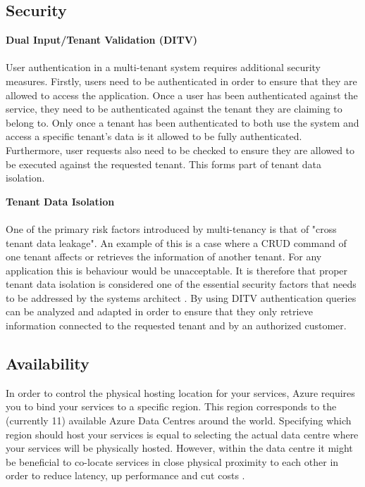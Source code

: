 \subsection{Security}
\label{sec:security} 

\textbf{Dual Input/Tenant Validation (DITV)}
\\
\\
\label{sec:ditv}
User authentication in a multi-tenant system requires additional security measures. Firstly, users need to be authenticated in order to ensure that they are allowed to access the application. Once a user has been authenticated against the service, they need to be authenticated against the tenant they are claiming to belong to. Only once a tenant has been authenticated to both use the system and access a specific tenant's data is it allowed to be fully authenticated. Furthermore, user requests also need to be checked to ensure they are allowed to be executed against the requested tenant. This forms part of tenant data isolation.


\textbf{Tenant Data Isolation}
\\
\\
One of the primary risk factors introduced by multi-tenancy is that of "cross tenant data leakage". An example of this is a case where a CRUD command of one tenant affects or retrieves the information of another tenant. For any application this is behaviour would be unacceptable. It is therefore that proper tenant data isolation is considered one of the essential security factors that needs to be addressed by the systems architect \cite{Wilder2012-so}. By using DITV authentication queries can be analyzed and adapted in order to ensure that they only retrieve information connected to the requested tenant and by an authorized customer.


\subsection{Availability}
\label{sec:availability}
In order to control the physical hosting location for your services, Azure requires you to bind your services to a specific region. This region corresponds to the (currently 11) available Azure Data Centres around the world\cite{Microsoft_Corporation2014-bf}. Specifying which region should host your services is equal to selecting the actual data centre where your services will be physically hosted. However, within the data centre it might be beneficial to co-locate services in close physical proximity to each other in order to reduce latency, up performance and cut costs \cite{Microsoft_Corporation2014-dn}.
 

